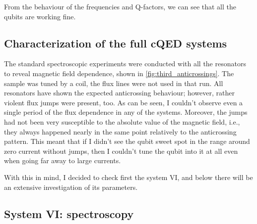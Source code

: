 \documentclass[12pt, twoside]{report}
\numberwithin{equation}{section}
\begin{document}
From the behaviour of the frequencies and Q-factors, we can see that all the qubits are working fine.


\subsection{Characterization of the full cQED systems}


The standard spectroscopic experiments were conducted with all the resonators to reveal magnetic field dependence, shown in \autoref{fig:third_anticrossings}. The sample was tuned by a coil, the flux lines were not used in that run. All resonators have shown the expected anticrossing behaviour; however, rather violent flux jumps were present, too. As can be seen, I couldn't observe even a single period of the flux dependence in any of the systems. Moreover, the jumps had not been very susceptible to the absolute value of the magnetic field, i.e., they always happened nearly in the same point relatively to the anticrossing pattern. This meant that if I didn't see the qubit sweet spot in the range around zero current without jumps, then I couldn't tune the qubit into it at all even when going far away to large currents.

With this in mind, I decided to check first the system VI, and below there will be an extensive investigation of its parameters.

\subsection{System VI: spectroscopy}
\end{document}
